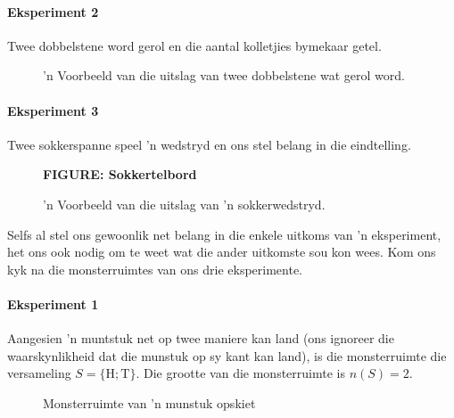 \paragraph{Eksperiment 2} Twee dobbelstene word gerol en die aantal kolletjies bymekaar getel. 

\begin{figure}[h]
  \begin{center}
  \end{center}
  \caption{'n Voorbeeld van die uitslag van twee dobbelstene wat gerol word.}
\end{figure}

\paragraph{Eksperiment 3} Twee sokkerspanne speel 'n wedstryd en ons stel belang in die eindtelling.

\begin{figure}[h]
  \begin{center}
    \textbf{FIGURE: Sokkertelbord}
  \end{center}
  \caption{'n Voorbeeld van die uitslag van 'n sokkerwedstryd.}
\end{figure}


Selfs al stel ons gewoonlik net belang in die enkele uitkoms van 'n eksperiment, het ons ook nodig om te weet wat die ander uitkomste sou kon wees. Kom ons kyk na die monsterruimtes van ons drie eksperimente.

\paragraph{Eksperiment 1} Aangesien 'n muntstuk net op twee maniere kan land (ons ignoreer die waarskynlikheid dat die munstuk op sy kant kan land),  is die monsterruimte die versameling \(S=\{\textrm{H}; \textrm{T}\}\). Die grootte van die monsterruimte is \(n(S)=2\).

\begin{figure}[h]
  \begin{center}
  \end{center}
  \caption{Monsterruimte van 'n munstuk opskiet}
\end{figure}


